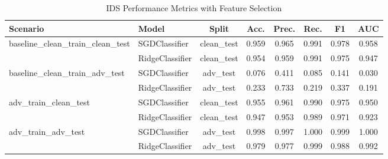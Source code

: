 \begin{table}[htbp]
\centering
\caption{IDS Performance Metrics with Feature Selection}
\label{tab:metrics}
\begin{tabular}{llcccccc}
\hline
\textbf{Scenario} & \textbf{Model} & \textbf{Split} & \textbf{Acc.} & \textbf{Prec.} & \textbf{Rec.} & \textbf{F1} & \textbf{AUC} \\
\hline
baseline_clean_train_clean_test & SGDClassifier & clean_test & 0.959 & 0.965 & 0.991 & 0.978 & 0.958 \\
 & RidgeClassifier & clean_test & 0.954 & 0.959 & 0.991 & 0.975 & 0.947 \\
\hline
baseline_clean_train_adv_test & SGDClassifier & adv_test & 0.076 & 0.411 & 0.085 & 0.141 & 0.030 \\
 & RidgeClassifier & adv_test & 0.233 & 0.733 & 0.219 & 0.337 & 0.191 \\
\hline
adv_train_clean_test & SGDClassifier & clean_test & 0.955 & 0.961 & 0.990 & 0.975 & 0.950 \\
 & RidgeClassifier & clean_test & 0.947 & 0.953 & 0.989 & 0.971 & 0.923 \\
\hline
adv_train_adv_test & SGDClassifier & adv_test & 0.998 & 0.997 & 1.000 & 0.999 & 1.000 \\
 & RidgeClassifier & adv_test & 0.979 & 0.977 & 0.999 & 0.988 & 0.992 \\
\hline
\end{tabular}
\end{table}